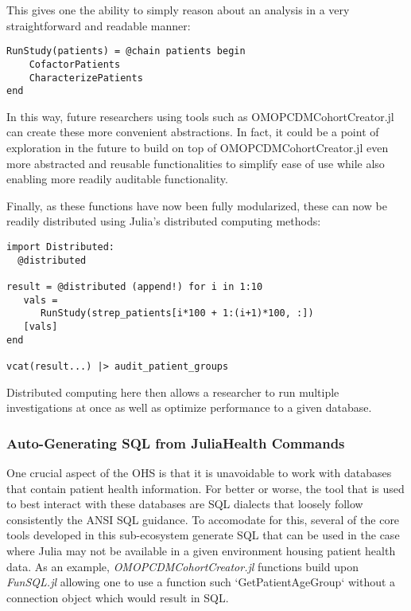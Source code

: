 \documentclass{juliacon}
\begin{document}
This gives one the ability to simply reason about an analysis in a very straightforward and readable manner:

\begin{verbatim}
RunStudy(patients) = @chain patients begin
    CofactorPatients
    CharacterizePatients
end
\end{verbatim}

In this way, future researchers using tools such as OMOPCDMCohortCreator.jl can create these more convenient abstractions.
In fact, it could be a point of exploration in the future to build on top of OMOPCDMCohortCreator.jl even more abstracted and reusable functionalities to simplify ease of use while also enabling more readily auditable functionality.

Finally, as these functions have now been fully modularized, these can now be readily distributed using Julia's distributed computing methods:

\begin{verbatim}
import Distributed:
  @distributed 

result = @distributed (append!) for i in 1:10
   vals = 
      RunStudy(strep_patients[i*100 + 1:(i+1)*100, :])
   [vals]
end

vcat(result...) |> audit_patient_groups
\end{verbatim}

Distributed computing here then allows a researcher to run multiple investigations at once as well as optimize performance to a given database.

\subsubsection{Auto-Generating SQL from JuliaHealth Commands}

One crucial aspect of the OHS is that it is unavoidable to work with databases that contain patient health information.
For better or worse, the tool that is used to best interact with these databases are SQL dialects that loosely follow consistently the ANSI SQL guidance.
To accomodate for this, several of the core tools developed in this sub-ecosystem generate SQL that can be used in the case where Julia may not be available in a given environment housing patient health data.
As an example, \textit{OMOPCDMCohortCreator.jl} functions build upon \textit{FunSQL.jl} allowing one to use a function such `GetPatientAgeGroup` without a connection object which would result in SQL.
\end{document}
